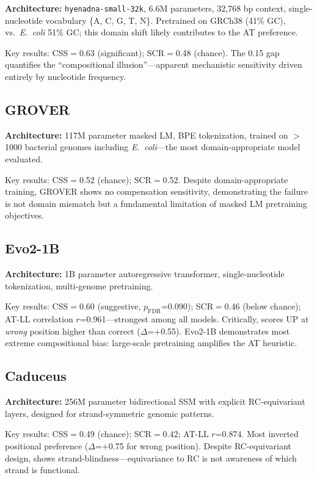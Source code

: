 \documentclass{article}
\begin{document}
\textbf{Architecture:} \texttt{hyenadna-small-32k}, 6.6M parameters, 32,768 bp context,
single-nucleotide vocabulary \{A, C, G, T, N\}. Pretrained on GRCh38 (41\% GC), vs.\
\textit{E.\ coli} 51\% GC; this domain shift likely contributes to the AT preference.

Key results: CSS$=$0.63 (significant); SCR$=$0.48 (chance). The 0.15 gap quantifies the
``compositional illusion''---apparent mechanistic sensitivity driven entirely by nucleotide
frequency.

\subsection{GROVER}

\textbf{Architecture:} 117M parameter masked LM, BPE tokenization, trained on $>$1000
bacterial genomes including \textit{E.\ coli}---the most domain-appropriate model evaluated.

Key results: CSS$=$0.52 (chance); SCR$=$0.52. Despite domain-appropriate training, GROVER
shows no compensation sensitivity, demonstrating the failure is not domain mismatch
but a fundamental limitation of masked LM pretraining objectives.

\subsection{Evo2-1B}

\textbf{Architecture:} 1B parameter autoregressive transformer, single-nucleotide
tokenization, multi-genome pretraining.

Key results: CSS$=$0.60 (suggestive, $p_{\text{FDR}}$=0.090); SCR$=$0.46 (below chance);
AT-LL correlation $r$=0.961---strongest among all models.
Critically, scores UP at \emph{wrong} position higher than correct ($\Delta$=$+$0.55).
Evo2-1B demonstrates most extreme compositional bias: large-scale pretraining amplifies
the AT heuristic.

\subsection{Caduceus}

\textbf{Architecture:} 256M parameter bidirectional SSM with explicit RC-equivariant layers,
designed for strand-symmetric genomic patterns.

Key results: CSS$=$0.49 (chance); SCR$=$0.42; AT-LL $r$=0.874. Most inverted positional
preference ($\Delta$=$+$0.75 for wrong position). Despite RC-equivariant design,
shows strand-blindness---equivariance to RC is not awareness of which strand is functional.
\end{document}
